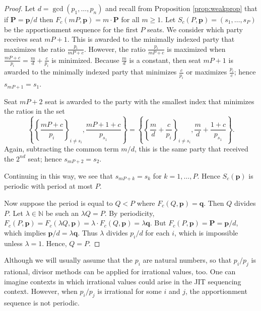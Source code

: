 \documentclass[pdflatex,sn-mathphys-num]{sn-jnl}
\theoremstyle{thmstyleone}%
\theoremstyle{thmstyletwo}%
\theoremstyle{thmstylethree}%
\begin{document}
\begin{proof}
Let $d=\gcd(p_1, \ldots, p_n)$ and recall from Proposition \ref{prop:weakprop} that if $\mathbf P = \mathbf p/d$ then $F_c(mP, \mathbf p) = m \cdot \mathbf P$ for all $m \ge 1$. Let $S_c(P, \mathbf p) = (s_1, \ldots, s_P)$ be the apportionment sequence for the first $P$ seats.  We consider which party receives seat $mP+1$. This is awarded to the minimally indexed party that maximizes the ratio $\frac{p_i}{mP+c}$.  However, the ratio $\frac{p_i}{mP+c}$ is maximized when $\frac{mP+c}{p_i} = \frac{m}{d} + \frac{c}{p_i}$ is minimized. Because $\frac{m}{d}$ is a constant, then seat $mP+1$ is awarded to the minimally indexed party that minimizes $\frac{c}{p_i}$ or maximizes $\frac{p_i}{c}$; hence $s_{mP+1}=s_1$.

Seat $mP+2$ seat is awarded to the party with the smallest index that minimizes the ratios in the set
$$\left\{ \left\{ \frac{mP+c}{p_i}\right\}_{i \ne s_i}, \frac{mP+1+c}{p_{s_1}} \right\}= \left\{ \left\{ \frac{m}{d} +\frac{c}{p_i}\right\}_{i \ne s_i}, \frac{m}{d}+\frac{1+c}{p_{s_1}} \right\}.$$
 Again, subtracting the  common term  $m/d$, this is the same party that received the $2^{nd}$ seat; hence $s_{mP+2}=s_2$. 
 
Continuing in this way, we see that $s_{mP+k}=s_k$ for $k=1, \ldots, P$.  Hence $S_c(\mathbf p)$ is periodic with period at most $P$.


Now suppose the period is equal to $Q < P$ where  $F_c(Q, \mathbf p) = \mathbf q$. Then $Q$ divides $P$. Let $\lambda \in \mathbb N$ be such an  $\lambda Q=P$. By periodicity, $F_c(P, \mathbf p) = F_c(\lambda Q, \mathbf p)= \lambda \cdot F_c(Q, \mathbf p)=\lambda \mathbf q$.  But $F_c(P, \mathbf p) =\mathbf P  =  \mathbf p/d$, which implies $ \mathbf p/d=  \lambda \mathbf q$. Thus $\lambda$ divides $p_i/d$ for each $i$, which is impossible unless $\lambda =1.$ Hence, $Q=P$.
\end{proof}

Although we will usually assume that the $p_i$ are natural numbers, so that $p_i/p_j$ is rational, divisor methods can be applied for irrational values, too. One can imagine contexts in which irrational values could arise in the JIT sequencing context.  However, when $p_i/p_j$ is irrational for some $i$ and $j$, the apportionment sequence is not periodic.
\end{document}
